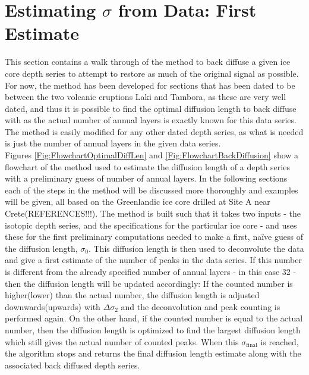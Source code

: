 \documentclass[../../CompleteThesis/Complete_1stDraft.tex]{subfiles}
\begin{document}
\section[First $\sigma$ estimate]{Estimating $\sigma$ from Data: First Estimate}
\label{Sec:Method_FirstSigmaEstimate}
This section contains a walk through of the method to back diffuse a given ice core depth series to attempt to restore as much of the original signal as possible. For now, the method has been developed for sections that has been dated to be between the two volcanic eruptions Laki and Tambora, as these are very well dated, and thus it is possible to find the optimal diffusion length to back diffuse with as the actual number of annual layers is exactly known for this data series. The method is easily modified for any other dated depth series, as what is needed is just the number of annual layers in the given data series.\\
Figures \ref{Fig:FlowchartOptimalDiffLen} and \ref{Fig:FlowchartBackDiffusion} show a flowchart of the method used to estimate the diffusion length of a depth series with a preliminary guess of number of annual layers. In the following sections each of the steps in the method will be discussed more thoroughly and examples will be given, all based on the Greenlandic ice core drilled at Site A near Crete(REFERENCES!!!).
The method is built such that it takes two inputs - the isotopic depth series, and the specifications for the particular ice core - and uses these for the first preliminary computations needed to make a first, naïve guess of the diffusion length, $\sigma_0$.
This diffusion length is then used to deconvolute the data and give a first estimate of the number of peaks in the data series. If this number is different from the already specified number of annual layers - in this case 32 - then the diffusion length will be updated accordingly: If the counted number is higher(lower) than the actual number, the diffusion length is adjusted downwards(upwards) with $\Delta\sigma_2$ and the deconvolution and peak counting is performed again.
On the other hand, if the counted number is equal to the actual number, then the diffusion length is optimized to find the largest diffusion length which still gives the actual number of counted peaks. When this $\sigma_{\text{final}}$ is reached, the algorithm stops and returns the final diffusion length estimate along with the associated back diffused depth series.
\end{document}
